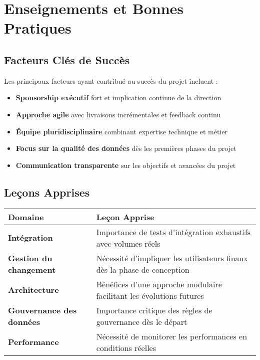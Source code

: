 \section{Enseignements et Bonnes Pratiques}

\subsection{Facteurs Clés de Succès}

Les principaux facteurs ayant contribué au succès du projet incluent :

\begin{itemize}
    \item \textbf{Sponsorship exécutif} fort et implication continue de la direction
    \item \textbf{Approche agile} avec livraisons incrémentales et feedback continu
    \item \textbf{Équipe pluridisciplinaire} combinant expertise technique et métier
    \item \textbf{Focus sur la qualité des données} dès les premières phases du projet
    \item \textbf{Communication transparente} sur les objectifs et avancées du projet
\end{itemize}

\subsection{Leçons Apprises}

\begin{center}
\begin{tabular}{|>{\bfseries}p{4cm}|p{9.5cm}|}
\hline
\rowcolor{lightblue} Domaine & Leçon Apprise \\
\hline
Intégration & Importance de tests d'intégration exhaustifs avec volumes réels \\
\hline
Gestion du changement & Nécessité d'impliquer les utilisateurs finaux dès la phase de conception \\
\hline
Architecture & Bénéfices d'une approche modulaire facilitant les évolutions futures \\
\hline
Gouvernance des données & Importance critique des règles de gouvernance dès le départ \\
\hline
Performance & Nécessité de monitorer les performances en conditions réelles \\
\hline
\end{tabular}
\end{center}
